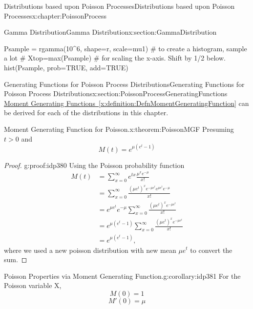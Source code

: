 \documentclass[oneside,10pt,]{book}
\newcommand{\xreffont}{\relax}
\numberwithin{equation}{section}
\newcommand{\gt}{>}
\begin{document}
\begin{chapterptx}{Distributions based upon Poisson Processes}{}{Distributions based upon Poisson Processes}{}{}{x:chapter:PoissonProcess}
\begin{sectionptx}{Gamma Distribution}{}{Gamma Distribution}{}{}{x:section:GammaDistribution}
\begin{sageinput}
Psample = rgamma(10^6, shape=r, scale=mu1)  # to create a histogram, sample a lot
# Xtop=max(Psample)          # for scaling the x-axis. Shift by 1/2 below.
hist(Psample, prob=TRUE, add=TRUE)
\end{sageinput}
\end{sectionptx}
%
%
\typeout{************************************************}
\typeout{************************************************}
%
\begin{sectionptx}{Generating Functions for Poisson Process Distributions}{}{Generating Functions for Poisson Process Distributions}{}{}{x:section:PoissonProcessGeneratingFunctions}
\hyperref[x:definition:DefnMomentGeneratingFunction]{Moment Generating Functions~{\xreffont\ref{x:definition:DefnMomentGeneratingFunction}}} can be derived for each of the distributions in this chapter.%
\begin{theorem}{Moment Generating Function for Poisson.}{}{x:theorem:PoissonMGF}%
Presuming \(t \gt 0\) and%
\begin{equation*}
M(t) = e^{\mu \left ( e^t - 1 \right )}
\end{equation*}
%
\end{theorem}
\begin{proof}{}{g:proof:idp380}
Using the Poisson probability function%
\begin{align*}
M(t) & = \sum_{x=0}^{\infty} e^{tx} \frac{\mu^x e^{-\mu}}{x!}\\
& = \sum_{x=0}^{\infty} \frac{\left (\mu e^t \right )^x e^{-\mu e^t} e^{\mu e^t} e^{-\mu} }{x!}\\
& =  e^{\mu e^t} e^{-\mu} \sum_{x=0}^{\infty} \frac{\left (\mu e^t \right )^x e^{-\mu e^t} }{x!}\\
& =  e^{\mu \left( e^t - 1 \right )}  \sum_{x=0}^{\infty} \frac{\left (\mu e^t \right )^x e^{-\mu e^t} }{x!}\\
& =  e^{\mu \left( e^t - 1 \right )},
\end{align*}
where we used a new poisson distribution with new mean \(\mu e^t\) to convert the sum.%
\end{proof}
\begin{corollary}{Poisson Properties via Moment Generating Function.}{}{g:corollary:idp381}%
For the Poisson variable X,%
\begin{equation*}
M(0) = 1
\end{equation*}
%
\begin{equation*}
M'(0) = \mu
\end{equation*}

\end{corollary}
\end{sectionptx}
\end{chapterptx}
\end{document}
